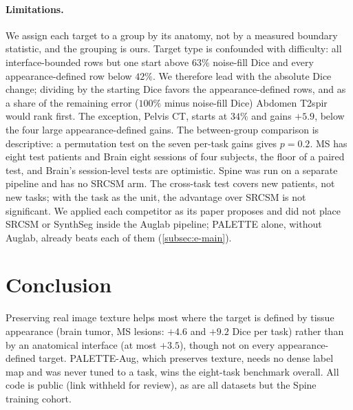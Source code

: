 \paragraph{Limitations.} We assign each target to a group by its anatomy, not
by a measured boundary statistic, and the grouping is ours. Target type is
confounded with difficulty: all interface-bounded rows but one start above
$63\%$ noise-fill Dice and every appearance-defined row below $42\%$. We
therefore lead with the absolute Dice change; dividing by the starting Dice
favors the appearance-defined rows, and as a share of the remaining error
($100\%$ minus noise-fill Dice) Abdomen T2spir would rank first. The
exception, Pelvis CT, starts at $34\%$ and gains $+5.9$, below the four
large appearance-defined gains.
The between-group comparison is descriptive: a permutation test on the
seven per-task gains gives $p=0.2$. MS has eight test patients and Brain eight
sessions of four subjects, the floor of a paired test, and Brain's
session-level tests are optimistic. Spine was run on a separate
pipeline and has no SRCSM arm. The cross-task test covers new patients, not new tasks; with the task as the
unit, the advantage over SRCSM is not significant.
We applied each competitor as its paper proposes and did not place SRCSM or
SynthSeg inside the Auglab pipeline; PALETTE alone, without Auglab, already
beats each of them (\cref{subsec:e-main}).

\section{Conclusion}
\label{sec:conclusion}

Preserving real image texture helps most where the target is defined by
tissue appearance (brain tumor, MS lesions: $+4.6$ and $+9.2$ Dice per task)
rather than by an anatomical interface (at most $+3.5$), though not on every
appearance-defined target. PALETTE-Aug, which preserves texture, needs no
dense label map and was never tuned to a task, wins the eight-task benchmark
overall. All code is public
(link withheld for review), as are all datasets but the Spine training cohort.
